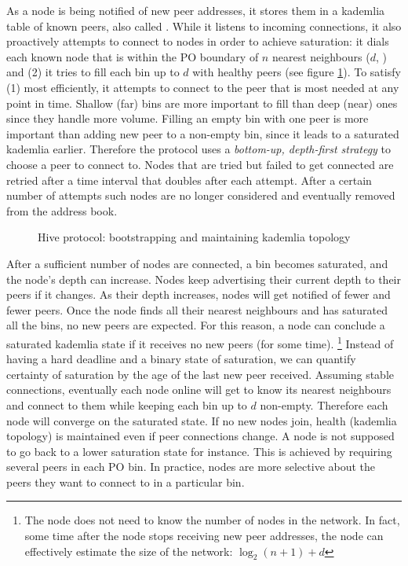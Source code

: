 As a node is being notified of new peer addresses, it stores them in  a kademlia table of known peers, also called . While it listens to incoming connections, it also proactively attempts to connect to nodes in order to achieve saturation: it dials each known node that is within the PO boundary of $n$ nearest neighbours ($d$, ) and (2) it tries to fill each bin up to $d$ with healthy peers (see figure \ref{fig:bootstrapping-kademlia}). To satisfy (1) most efficiently, it attempts to connect to the peer that is most needed at any point in time. Shallow (far) bins are more important to fill than deep (near) ones since they handle more volume. Filling an empty bin with one peer is more important than adding new peer to a non-empty bin, since it leads to a saturated kademlia earlier. Therefore the protocol uses a \emph{bottom-up, depth-first strategy} to choose a peer to connect to.  Nodes that are tried but failed to get connected are retried after a time interval that doubles after each attempt. After a certain number of attempts such nodes are no longer considered and eventually removed from the address book.



\begin{figure}[htbp]
   \centering
   \caption{Hive protocol: bootstrapping and maintaining kademlia topology}
   \label{fig:bootstrapping-kademlia}
\end{figure}

After a sufficient number of nodes are connected, a bin becomes saturated, and the node's depth can increase. Nodes keep advertising their current depth to their peers if it changes. As their  depth increases, nodes will get notified of fewer and fewer peers. Once the node finds all their nearest neighbours and has saturated all the bins, no new peers are expected. For this reason, a node can conclude  a saturated kademlia state if it receives no new peers (for some time).%
%
\footnote{The node does not need to know the number of nodes in the network. In fact, some time after the node stops receiving new peer addresses, the node can effectively estimate the size of the network: $\log_2(n+1)+ d$}
%
Instead of having a hard deadline and a binary state of saturation, we can quantify certainty of saturation by the age of the last new peer received. Assuming stable connections, eventually each node online will get to know its nearest neighbours and connect to them while keeping each bin up to $d$ non-empty. Therefore each node will converge on the saturated state. If no new nodes join, health (kademlia topology) is maintained even if peer connections change. A node is not supposed to go back to a lower saturation state for instance. This is achieved by requiring several peers in each PO bin. In practice, nodes are more selective about the peers they want to connect to in a particular bin.

